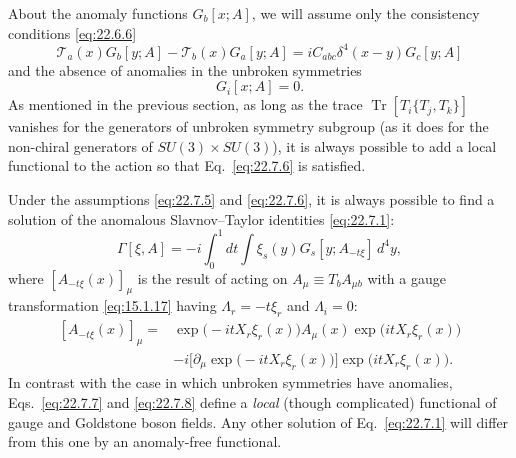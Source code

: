 About the anomaly functions $G_b[x;A]$, we will assume only the
consistency conditions \eqref{eq:22.6.6}
\begin{equation}
 \mathcal T_a(x)G_b[y;A]
 -\mathcal T_b(x)G_a[y;A]
 =iC_{abc}\delta^4(x-y)G_c[y;A]
 \tag{22.7.5}\label{eq:22.7.5}
\end{equation}
and the absence of anomalies in the unbroken symmetries
\begin{equation}
 G_i[x;A]=0.
 \tag{22.7.6}\label{eq:22.7.6}
\end{equation}
As mentioned in the previous section, as long as the trace
$\operatorname{Tr}[T_i\{T_j,T_k\}]$ vanishes for the generators of
unbroken symmetry subgroup (as it does for the non-chiral generators of
$SU(3)\times SU(3)$), it is always possible to add a local functional to
the action so that Eq.~\eqref{eq:22.7.6} is satisfied.

Under the assumptions \eqref{eq:22.7.5} and \eqref{eq:22.7.6}, it is
always possible to find a solution of the anomalous Slavnov--Taylor
identities \eqref{eq:22.7.1}:
\begin{equation}
 \Gamma[\xi,A]
 =-i\int_0^1dt\int \xi_s(y)G_s[y;A_{-t\xi}]\,d^4y,
 \tag{22.7.7}\label{eq:22.7.7}
\end{equation}
where $[A_{-t\xi}(x)]_\mu$ is the result of acting on
$A_\mu\equiv T_b A_{\mu b}$ with a gauge transformation
\eqref{eq:15.1.17} having $\Lambda_r=-t\xi_r$ and $\Lambda_i=0$:
\begin{equation}
 \begin{aligned}
 [A_{-t\xi}(x)]_\mu
 ={}&\exp\bigl(-itX_r\xi_r(x)\bigr)A_\mu(x)
 \exp\bigl(itX_r\xi_r(x)\bigr)
 \\
 &-i\bigl[\partial_\mu\exp\bigl(-itX_r\xi_r(x)\bigr)\bigr]
 \exp\bigl(itX_r\xi_r(x)\bigr).
 \end{aligned}
 \tag{22.7.8}\label{eq:22.7.8}
\end{equation}
In contrast with the case in which unbroken symmetries have anomalies,
Eqs.~\eqref{eq:22.7.7} and \eqref{eq:22.7.8} define a \emph{local}
(though complicated) functional of gauge and Goldstone boson fields.
Any other solution of Eq.~\eqref{eq:22.7.1} will differ from this one by
an anomaly-free functional.


